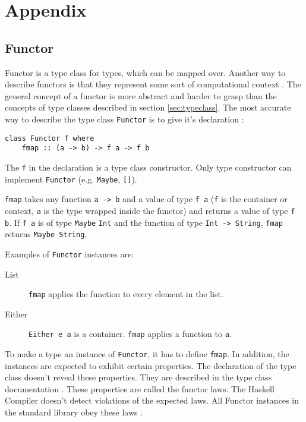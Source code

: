 
\section{Appendix}
\label{sec:appendix}

\subsection{Functor}
\label{sec:functor}

Functor is a type class for types, which can be mapped over. Another way to describe functors is that they represent some sort of computational context \cite{yorgey}. The general concept of a functor is more abstract and harder to grasp than the concepts of type classes described in section \ref{sec:typeclass}.
The most accurate way to describe the type class \verb|Functor| is to give it's declaration \cite{data.functor}:

\begin{verbatim}
class Functor f where
    fmap :: (a -> b) -> f a -> f b
\end{verbatim}

The \verb|f| in the declaration is a type class constructor. Only type constructor can implement \verb|Functor| (e.g. \verb|Maybe|, \verb|[]|).

\verb|fmap| takes any function \verb|a -> b| and a value of type \verb|f a| (\verb|f| is the container or context, \verb|a| is the type wrapped inside the functor) and returns a value of type \verb|f b|. 
If \verb|f a| is of type \verb|Maybe| \verb|Int| and the function of type \verb|Int -> String|, \verb|fmap| returns \verb|Maybe String|. 

Examples of \verb|Functor| instances are:

\begin{description}
\item[List] \verb|fmap| applies the function to every element in the list.
\item[Either] \verb|Either e a| is a container. \verb|fmap| applies a function to \verb|a|.
\end{description}

To make a type an instance of \verb|Functor|, it has to define \verb|fmap|. In addition, the instances are expected to exhibit certain properties. The declaration of the type class doesn't reveal these properties. They are described in the type class documentation \cite{data.functor} \cite{Marlow_2010}. These properties are called the functor laws.
The Haskell Compiler doesn't detect violations of the expected laws. All Functor instances in the standard library obey these laws \cite{yorgey} \cite{Lipovaca}.

